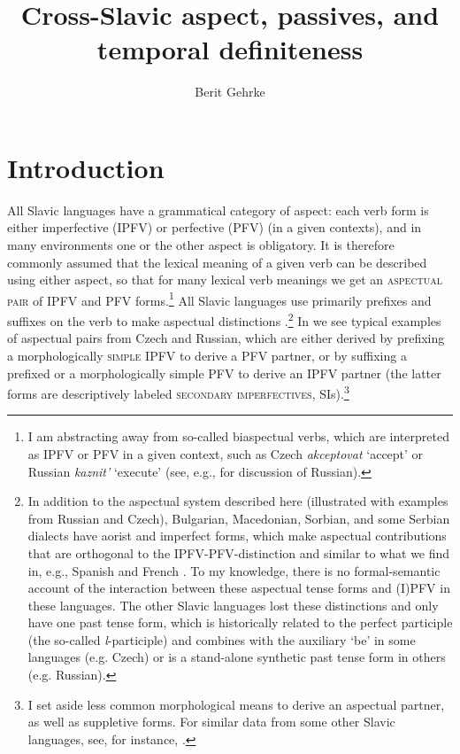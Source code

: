 \documentclass[output=paper,colorlinks,citecolor=brown]{langscibook}
\author{Berit Gehrke\orcid{0000-0002-6315-9532}\affiliation{Humboldt-Universität zu Berlin}}
\title{Cross-Slavic aspect, passives, and temporal definiteness}
\begin{document}
\maketitle

\section{Introduction}
\label{sec:intro}

All Slavic languages have a grammatical category of aspect: each verb form is either imperfective (IPFV) or perfective (PFV) (in a given contexts), and in many environments one or the other aspect is obligatory. It is therefore commonly assumed that the lexical meaning of a given verb can be described using either aspect, so that for many lexical verb meanings we get an \textsc{aspectual pair} of IPFV and PFV forms.\footnote{I am abstracting away from so-called biaspectual verbs, which are interpreted as IPFV or PFV in a given context, such as Czech \textit{akceptovat} `accept' or Russian \textit{kaznit'} `execute' (see, e.g., \citealt{janda07} for discussion of Russian).} All Slavic languages use primarily prefixes and suffixes on the verb to make aspectual distinctions%
.\footnote{\label{fn:aorimpf}In addition to the aspectual system described here (illustrated with examples from Russian and Czech), Bulgarian, Macedonian, Sorbian, and some Serbian dialects have aorist and imperfect forms, which make aspectual contributions that are orthogonal to the IPFV-PFV-distinction and similar to what we find in, e.g., Spanish and French \citep[see, e.g.,][]{deswart98}. To my knowledge, there is no formal-semantic account of the interaction between these aspectual tense forms and (I)PFV in these languages. The other Slavic languages lost these distinctions and only have one past tense form, which is historically related to the perfect participle (the so-called \textit{l}-participle) and combines with the auxiliary `be' in some languages (e.g. Czech) or is a stand-alone synthetic past tense form in others (e.g. Russian).} In  we see typical examples of aspectual pairs from Czech and Russian, which are either derived by prefixing a morphologically \textsc{simple} IPFV to derive a PFV partner, or by suffixing a prefixed or a morphologically simple PFV to derive an IPFV partner (the latter forms are descriptively labeled \textsc{secondary imperfectives}, SIs).\footnote{I set aside less common morphological means to derive an aspectual partner, as well as suppletive forms. For similar data from some other Slavic languages, see, for instance, \citet{arsenijevic06,zaucerdiss,kwapidiss}.}
\end{document}
